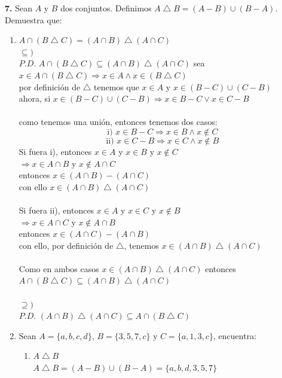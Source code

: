 \documentclass[12pt]{article}
\begin{document}
%
%
\textbf{7.} Sean $A$ y $B$ dos conjuntos. Definimos $A \bigtriangleup B = (A - B) \cup (B - A)$. Demuestra que:
\begin{enumerate}[label=\alph*)]
    \item $A \cap (B \bigtriangleup C) = (A \cap B) \bigtriangleup (A \cap C)$\\
    $\subseteq)$\\
    $P.D$. $A \cap (B \bigtriangleup C) \subseteq (A \cap B) \bigtriangleup (A \cap C)$
    sea $x \in A \cap (B \bigtriangleup C) \Longrightarrow x \in A \land x \in (B \bigtriangleup C)$\\
    por definición de $\bigtriangleup$ tenemos que $x \in A$ y  $x \in (B - C) \cup (C - B)$\\
    ahora, si $x \in (B - C) \cup (C - B) \Longrightarrow x \in B - C \lor x \in C - B$\\
    \\
    como tenemos una unión, entonces tenemos dos casos:
    \[\text{i) } x \in B - C \Longrightarrow x \in B \land x \notin C\]
    \[\text{ii) } x \in C - B \Longrightarrow x \in C \land x \notin B\]
    Si fuera i), entonces $x \in A$ y $x \in B$ y $x \notin C$\\
    $\Longrightarrow x \in A \cap B$ y $x \notin A \cap C$\\
    entonces $x \in (A \cap B) - (A \cap C)$\\
    con ello $x \in (A \cap B) \bigtriangleup (A \cap C)$\\
    \\
    Si fuera ii), entonces $x \in A$ y $x \in C$ y $x \notin B$\\
    $\Longrightarrow x \in A \cap C$ y $x \notin A \cap B$\\
    entonces $x \in (A \cap C) - (A \cap B)$\\
    con ello, por definición de $\bigtriangleup$, tenemos $x \in (A \cap B) \bigtriangleup (A \cap C)$\\
    \\
    Como en ambos casos $x \in (A \cap B) \bigtriangleup (A \cap C)$
    entonces $A \cap (B \bigtriangleup C) \subseteq (A \cap B) \bigtriangleup (A \cap C)$\\
    \\
    $\supseteq)$\\
    $P.D$. $(A \cap B) \bigtriangleup (A \cap C) \subseteq A \cap (B \bigtriangleup C)$


    \item Sean $A = \{a, b, c, d\}$, $B = \{3, 5, 7, c\}$ y $C = \{a, 1, 3, c\}$, encuentra:
    \begin{enumerate}
        \item $A \bigtriangleup B$\\
        $A \bigtriangleup B = (A - B) \cup (B - A) = \{a, b, d, 3, 5, 7\}$\\


\end{enumerate}
\end{enumerate}
\end{document}
